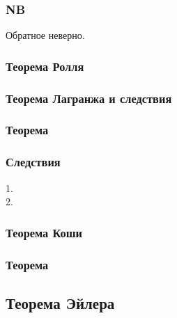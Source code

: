 \subsubsection*{NB} Обратное неверно.

\subsubsection{Теорема Ролля}

\subsubsection{Теорема Лагранжа и следствия}
\subsubsection*{Теорема}


\subsubsection*{Следствия}
1.\\
2.



\subsubsection{Теорема Коши}

\subsubsection{Теорема }

\subsection{Теорема Эйлера}
